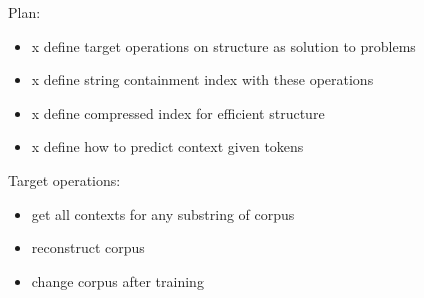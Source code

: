 


%



Plan:
\begin{itemize}
\item x define target operations on structure as solution to problems
\item x define string containment index with these operations
\item x define compressed index for efficient structure
\item x define how to predict context given tokens
\end{itemize}


Target operations:
\begin{itemize}
\item get all contexts for any substring of corpus
\item reconstruct corpus
\item change corpus after training
\end{itemize}

